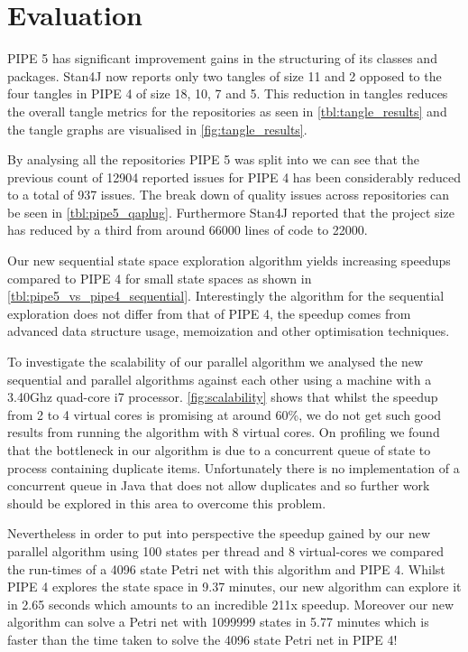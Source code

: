 \section{Evaluation}
PIPE 5 has significant improvement gains in the structuring of its classes and packages. Stan4J now reports only two tangles of size 11 and 2 opposed to the four tangles in PIPE 4 of size 18, 10, 7 and 5. This reduction in tangles reduces the overall tangle metrics for the repositories as seen in \cref{tbl:tangle_results} and the tangle graphs are visualised in \cref{fig:tangle_results}. 

By analysing all the repositories PIPE 5 was split into we can see that the previous count of \num{12904} reported issues for PIPE 4 has been considerably reduced to a total of \num{937} issues. The break down of quality issues across repositories can be seen in \cref{tbl:pipe5_qaplug}. Furthermore Stan4J reported that the project size has reduced by a third from around \num{66000} lines of code to \num{22000}.

Our new sequential state space exploration algorithm  yields increasing speedups compared to PIPE 4 for small state spaces as shown in \cref{tbl:pipe5_vs_pipe4_sequential}. Interestingly the algorithm for the sequential exploration does not differ from that of PIPE 4, the speedup comes from advanced data structure usage, memoization and other optimisation techniques.

To investigate the scalability of our parallel algorithm we analysed the new sequential and parallel algorithms against each other using a machine with a 3.40Ghz quad-core i7 processor. \cref{fig:scalability} shows that whilst the speedup from 2 to 4 virtual cores is promising at around 60\%, we do not get such good results from running the algorithm with 8 virtual cores. On profiling we found that the bottleneck in our algorithm is due to a concurrent queue of state to process containing duplicate items. Unfortunately there is no implementation of a concurrent queue in Java that does not allow duplicates and so further work should be explored in this area to overcome this problem.

Nevertheless in order to put into perspective the speedup gained by our new parallel algorithm using 100 states per thread and 8 virtual-cores we compared the run-times of a 4096 state Petri net with this algorithm and PIPE 4. Whilst PIPE 4 explores the state space in 9.37 minutes, our new algorithm can explore it in 2.65 seconds which amounts to an incredible 211x speedup. Moreover our new algorithm can solve a Petri net with \num{1099999} states in 5.77 minutes which is faster than the time taken to solve the 4096 state Petri net in PIPE 4!







